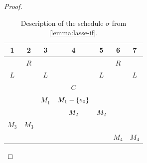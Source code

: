 \begin{proof}
\begin{table}[htpb]
\begin{tabular}{ c | c | c | c | c | c | c }
	1 & 2 & 3 & 4 & 5 & 6 & 7 \\
	\hline
	 & $R$ & & & & $R$ & \\
	 $L$ & & $L$ & & $L$ &  & $L$ \\
	 & & & $C$ & & &  \\
	 & & $M_1$ & $M_1 - \{ e_0 \}$  & & &  \\
	  & & & $M_2$  & $M_2$ & &  \\
	  $M_3$ & $M_3$ & &  &  & &  \\
	   & & &  &  & $M_4$ & $M_4$ 
 \end{tabular}
 \caption{Description of the schedule $\sigma$ from \cref{lemma:lasse-if}.}
 \label{table:lasse-if}
\end{table}
 
\end{proof}

